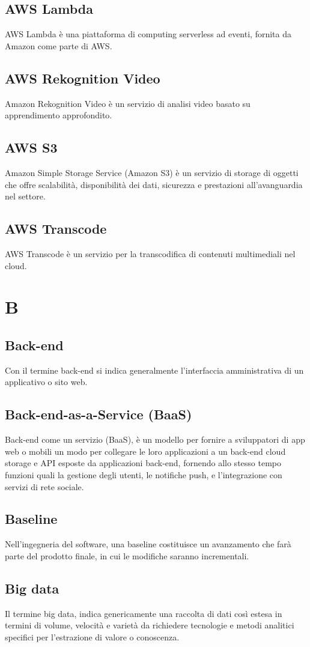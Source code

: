 \subsection{AWS Lambda}  AWS Lambda è una piattaforma di computing serverless ad eventi, fornita da Amazon come parte di AWS.
\subsection{AWS Rekognition Video}  Amazon Rekognition Video è un servizio di analisi video basato su apprendimento approfondito.
\subsection{AWS S3}  Amazon Simple Storage Service (Amazon S3) è un servizio di storage di oggetti che offre scalabilità, disponibilità dei dati, sicurezza e prestazioni all'avanguardia nel settore.
\subsection{AWS Transcode}  AWS Transcode è un servizio per la transcodifica di contenuti multimediali nel cloud.

\newpage \section{B}
\subsection{Back-end}  Con il termine back-end si indica generalmente l'interfaccia amministrativa di un applicativo o sito web.
\subsection{Back-end-as-a-Service (BaaS)}  Back-end come un servizio (BaaS), è un modello per fornire a sviluppatori di app web o mobili un modo per collegare le loro applicazioni a un back-end cloud storage e API esposte da applicazioni back-end, fornendo allo stesso tempo funzioni quali la gestione degli utenti, le notifiche push, e l'integrazione con servizi di rete sociale.
\subsection{Baseline}  Nell'ingegneria del software, una baseline costituisce un avanzamento che farà parte del prodotto finale, in cui le modifiche saranno incrementali.
\subsection{Big data}  Il termine big data, indica genericamente una raccolta di dati così estesa in termini di volume, velocità e varietà da richiedere tecnologie e metodi analitici specifici per l'estrazione di valore o conoscenza.
